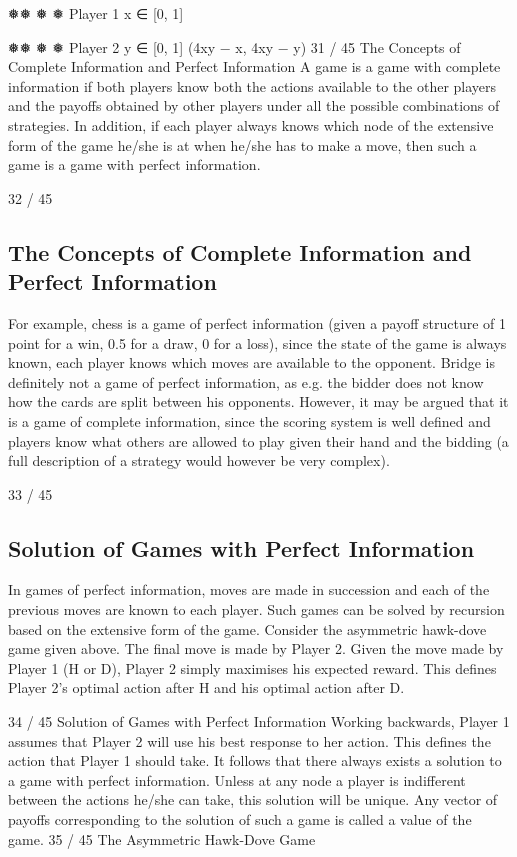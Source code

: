 \documentclass[]{report}
\begin{document}
❅❅
❅
❅
Player 1
x ∈ [0, 1]



❅❅
❅
❅
Player 2
y ∈ [0, 1]
(4xy − x, 4xy − y)
31 / 45
The Concepts of Complete Information and Perfect
Information
A game is a game with complete information if both players
know both the actions available to the other players and the
payoffs obtained by other players under all the possible
combinations of strategies.
In addition, if each player always knows which node of the
extensive form of the game he/she is at when he/she has to make
a move, then such a game is a game with perfect information.

32 / 45
\subsection{The Concepts of Complete Information and Perfect
Information}
For example, chess is a game of perfect information (given a payoff
structure of 1 point for a win, 0.5 for a draw, 0 for a loss), since
the state of the game is always known, each player knows which
moves are available to the opponent.
Bridge is definitely not a game of perfect information, as e.g. the
bidder does not know how the cards are split between his
opponents. However, it may be argued that it is a game of
complete information, since the scoring system is well defined and
players know what others are allowed to play given their hand and
the bidding (a full description of a strategy would however be very
complex).

33 / 45
\subsection{Solution of Games with Perfect Information}
In games of perfect information, moves are made in succession and
each of the previous moves are known to each player.
Such games can be solved by recursion based on the extensive
form of the game.
Consider the asymmetric hawk-dove game given above. The final
move is made by Player 2. Given the move made by Player 1 (H or
D), Player 2 simply maximises his expected reward.
This defines Player 2’s optimal action after H and his optimal
action after D.

34 / 45
Solution of Games with Perfect Information
Working backwards, Player 1 assumes that Player 2 will use his
best response to her action.
This defines the action that Player 1 should take.
It follows that there always exists a solution to a game with perfect
information. Unless at any node a player is indifferent between the
actions he/she can take, this solution will be unique.
Any vector of payoffs corresponding to the solution of such a game
is called a value of the game.
35 / 45
The Asymmetric Hawk-Dove Game
\end{document}
